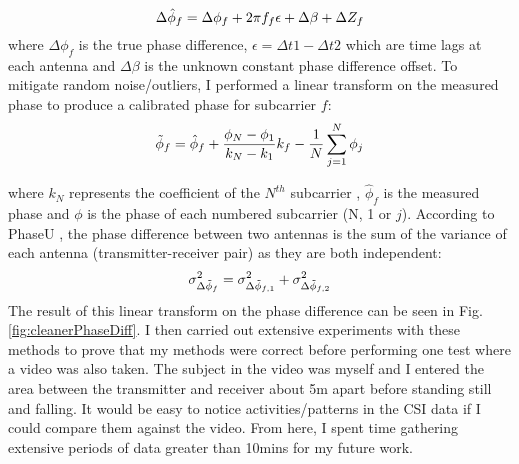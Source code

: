 \begin{equation}\label{eqn:3.4}
    \Delta\hat{\phi}_f = \Delta\phi_{f}+2\pi f_{f}\epsilon  + \Delta\beta + \Delta Z_f
    \vspace{-11pt}
\end{equation}
where $\Delta\phi_{f}$ is the true phase difference, $\epsilon = \Delta t1 - \Delta t2$ which are time lags at each antenna and $\Delta\beta$ is the unknown constant phase difference offset. To mitigate random noise/outliers, I performed a linear transform on the measured phase to produce a calibrated phase for subcarrier $f$:
\begin{equation}\label{eqn:3.5}
    \Tilde{\phi}_f = \hat{\phi}_{f}+\frac{\phi_{N}-\phi_{1}}{k_{N}-k_1}k_{f}-\frac{1}{N}\sum_{j=1}^{N} \phi_{j}
    \vspace{-11pt}
\end{equation} \par
where $k_{N}$ represents the coefficient of the $N^{th}$ subcarrier  \citep{full802.11nStandard}, $\hat{\phi}_{f}$ is the measured phase and $\phi$ is the phase of each numbered subcarrier (N, 1 or $j$).
According to PhaseU \citep{PhaseU}, the phase difference between two antennas is the sum of the variance of each antenna (transmitter-receiver pair) as they are both independent:
\vspace{-11pt}
\begin{equation}\label{eqn:3.6}
    \sigma^{2}_{\Delta\Tilde{\phi}_f} = \sigma^{2}_{\Delta\Tilde{\phi}_{f,1}} + \sigma^{2}_{\Delta\Tilde{\phi}_{f,2}}
    \vspace{-11pt}
\end{equation} 
The result of this linear transform on the phase difference can be seen in Fig. \ref{fig:cleanerPhaseDiff}. I then carried out extensive experiments with these methods to prove that my methods were correct before performing one test where a video was also taken. The subject in the video was myself and I entered the area between the transmitter and receiver about 5m apart before standing still and falling. It would be easy to notice activities/patterns in the CSI data if I could compare them against the video. From here, I spent time gathering extensive periods of data greater than 10mins for my future work.

